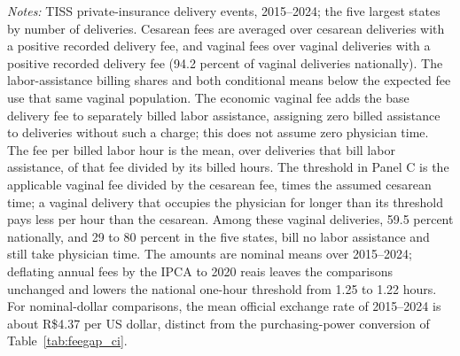 \begin{table}[H]
\begin{minipage}{\linewidth}
\textit{Notes:} TISS private-insurance delivery events, 2015--2024; the five largest states by number of deliveries. Cesarean fees are averaged over cesarean deliveries with a positive recorded delivery fee, and vaginal fees over vaginal deliveries with a positive recorded delivery fee (94.2 percent of vaginal deliveries nationally). The labor-assistance billing shares and both conditional means below the expected fee use that same vaginal population. The economic vaginal fee adds the base delivery fee to separately billed labor assistance, assigning zero billed assistance to deliveries without such a charge; this does not assume zero physician time. The fee per billed labor hour is the mean, over deliveries that bill labor assistance, of that fee divided by its billed hours. The threshold in Panel C is the applicable vaginal fee divided by the cesarean fee, times the assumed cesarean time; a vaginal delivery that occupies the physician for longer than its threshold pays less per hour than the cesarean. Among these vaginal deliveries, 59.5 percent nationally, and 29 to 80 percent in the five states, bill no labor assistance and still take physician time. The amounts are nominal means over 2015--2024; deflating annual fees by the IPCA to 2020 reais leaves the comparisons unchanged and lowers the national one-hour threshold from 1.25 to 1.22 hours. For nominal-dollar comparisons, the mean official exchange rate of 2015--2024 is about R\$4.37 per US dollar, distinct from the purchasing-power conversion of Table~\ref{tab:feegap_ci}.
\end{minipage}
\end{table}
